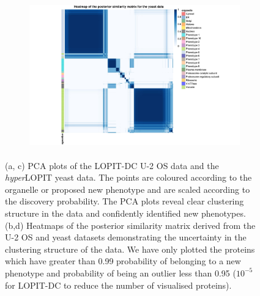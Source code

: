 \documentclass[12pt,english]{article}
\begin{document}
\begin{figure}
\begin{subfigure}[t]{0.5\textwidth}
	\centering
	\includegraphics[height=2.5in]{heatmapYeast.jpg}
	\caption{}
\end{subfigure}
\caption{(a, c) PCA plots of the LOPIT-DC U-2 OS data and the \textit{hyper}LOPIT yeast data. The points are coloured according to the organelle or proposed new phenotype and are scaled according to the discovery probability. The PCA plots reveal clear clustering structure in the data and confidently identified new phenotypes. (b,d) Heatmaps of the posterior similarity matrix derived from the U-2 OS and yeast datasets demonstrating the uncertainty in the clustering structure of the data. We have only plotted the proteins which have greater than 0.99 probability of belonging to a new phenotype and probability of being an outlier less than 0.95 ($10^{-5}$ for LOPIT-DC to reduce the number of visualised proteins).}
 \label{figure:DC}
\end{figure}
\end{document}

